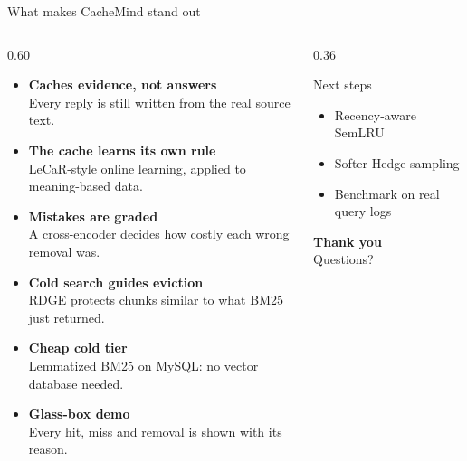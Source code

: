 \documentclass[aspectratio=169,11pt]{beamer}
\newcommand{\say}[1]{\\ {\footnotesize\color{cmgrey}#1}}
\begin{document}
\begin{frame}{What makes CacheMind stand out}
\begin{columns}[T,onlytextwidth]
\begin{column}{0.60\textwidth}
\small
\begin{itemize}
  \setlength{\itemsep}{3pt}
  \item \textbf{Caches evidence, not answers}
        \say{Every reply is still written from the real source text.}
  \item \textbf{The cache learns its own rule}
        \say{LeCaR-style online learning, applied to meaning-based data.}
  \item \textbf{Mistakes are graded}
        \say{A cross-encoder decides how costly each wrong removal was.}
  \item \textbf{Cold search guides eviction}
        \say{RDGE protects chunks similar to what BM25 just returned.}
  \item \textbf{Cheap cold tier}
        \say{Lemmatized BM25 on MySQL: no vector database needed.}
  \item \textbf{Glass-box demo}
        \say{Every hit, miss and removal is shown with its reason.}
\end{itemize}
\end{column}
\begin{column}{0.36\textwidth}
\begin{block}{Next steps}
\small
\begin{itemize}
  \item Recency-aware SemLRU
  \item Softer Hedge sampling
  \item Benchmark on real query logs
\end{itemize}
\end{block}
\vspace{6pt}
\centering
{\large\bfseries\color{cmblue} Thank you}\\[2pt]
{\small Questions?}
\end{column}
\end{columns}
\end{frame}
\end{document}
